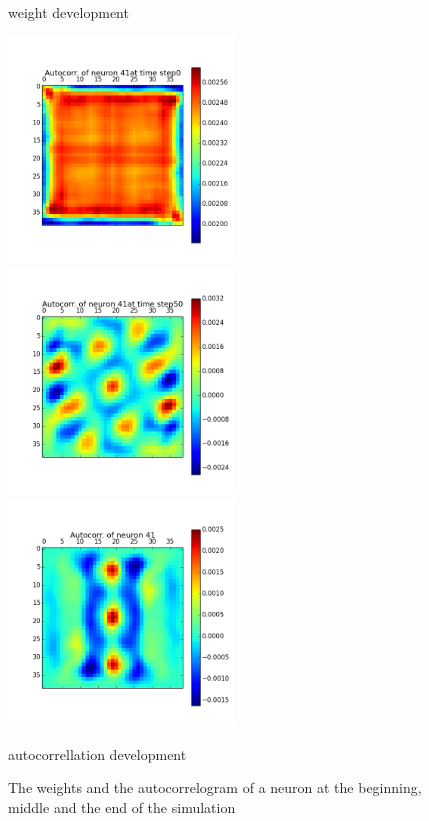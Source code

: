 \documentclass[a4paper, 12pt]{article}
\begin{document}
\begin{figure}[htbp]
\begin{minipage}[hbt]{0,49\textwidth}
        \caption{weight development}
        \label{LabelA}
\end{minipage}
\begin{minipage}[hbt]{0,49\textwidth}
        \centering
\includegraphics[width=6cm,height=6cm]{neurons/neuron_a_41_t_0.png}\\[10pt]
\includegraphics[width=6cm,height=6cm]{neurons/neuron_a_41_t_50.png}\\[10pt]
\includegraphics[width=6cm,height=6cm]{neurons/neuron_a_41.png}
        \caption{autocorrellation development}
        \label{LabelB}
\end{minipage}
\centering
\caption{The weights and the autocorrelogram of a neuron at the beginning, middle and the end of the simulation}
\label{time-evol}
\end{figure}
\end{document}
